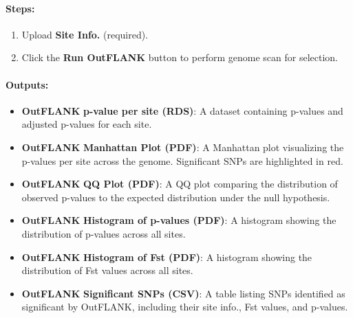 \documentclass[
]{book}
\begin{document}
\paragraph*{\texorpdfstring{\textbf{Steps:}}{Steps:}}\label{steps-8}

\begin{enumerate}
\def\labelenumi{\arabic{enumi}.}
\item
  {Upload} \textbf{Site Info.} (required).
\item
  Click the {\textbf{Run OutFLANK}} button to perform genome scan for selection.
\end{enumerate}

\paragraph*{Outputs:}\label{outputs-17}

\begin{itemize}
\item
  \textbf{OutFLANK} \textbf{p-value per site (RDS)}: A dataset containing p-values and adjusted p-values for each site.
\item
  \textbf{OutFLANK} \textbf{Manhattan Plot (PDF)}: A Manhattan plot visualizing the p-values per site across the genome. Significant SNPs are highlighted in red.
\item
  \textbf{OutFLANK} \textbf{QQ Plot (PDF)}: A QQ plot comparing the distribution of observed p-values to the expected distribution under the null hypothesis.
\item
  \textbf{OutFLANK} \textbf{Histogram of p-values (PDF)}: A histogram showing the distribution of p-values across all sites.
\item
  \textbf{OutFLANK} \textbf{Histogram of Fst (PDF)}: A histogram showing the distribution of Fst values across all sites.
\item
  \textbf{OutFLANK} \textbf{Significant SNPs (CSV)}: A table listing SNPs identified as significant by OutFLANK, including their site info., Fst values, and p-values.
\end{itemize}
\end{document}
